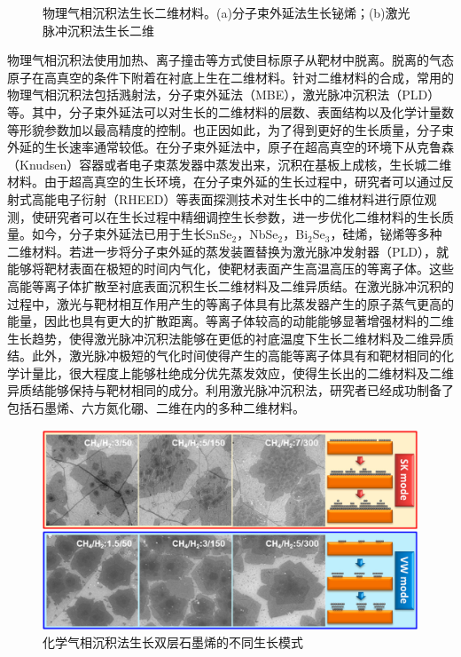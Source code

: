 \begin{figure}
{        }
        \caption{物理气相沉积法生长二维材料。(a)分子束外延法生长铋烯；(b)激光脉冲沉积法生长二维}
    \end{figure}

    物理气相沉积法使用加热、离子撞击等方式使目标原子从靶材中脱离。脱离的气态原子在高真空的条件下附着在衬底上生在二维材料。针对二维材料的合成，常用的物理气相沉积法包括溅射法，分子束外延法（MBE），激光脉冲沉积法（PLD）等。其中，分子束外延法可以对生长的二维材料的层数、表面结构以及化学计量数等形貌参数加以最高精度的控制。也正因如此，为了得到更好的生长质量，分子束外延的生长速率通常较低。在分子束外延法中，原子在超高真空的环境下从克鲁森（Knudsen）容器或者电子束蒸发器中蒸发出来，沉积在基板上成核，生长城二维材料。由于超高真空的生长环境，在分子束外延的生长过程中，研究者可以通过反射式高能电子衍射（RHEED）等表面探测技术对生长中的二维材料进行原位观测，使研究者可以在生长过程中精细调控生长参数，进一步优化二维材料的生长质量。如今，分子束外延法已用于生长SnSe$_2$，NbSe$_2$，Bi$_2$Se$_3$，硅烯，铋烯等多种二维材料。若进一步将分子束外延的蒸发装置替换为激光脉冲发射器（PLD），就能够将靶材表面在极短的时间内气化，使靶材表面产生高温高压的等离子体。这些高能等离子体扩散至衬底表面沉积生长二维材料及二维异质结。在激光脉冲沉积的过程中，激光与靶材相互作用产生的等离子体具有比蒸发器产生的原子蒸气更高的能量，因此也具有更大的扩散距离。等离子体较高的动能能够显著增强材料的二维生长趋势，使得激光脉冲沉积法能够在更低的衬底温度下生长二维材料及二维异质结。此外，激光脉冲极短的气化时间使得产生的高能等离子体具有和靶材相同的化学计量比，很大程度上能够杜绝成分优先蒸发效应，使得生长出的二维材料及二维异质结能够保持与靶材相同的成分。利用激光脉冲沉积法，研究者已经成功制备了包括石墨烯、六方氮化硼、二维在内的多种二维材料。

    \begin{figure}[htb]
        \includegraphics{pic/INTRO_growth_grapheneGrowthMode.png}
        \caption{化学气相沉积法生长双层石墨烯的不同生长模式}
    \end{figure}

